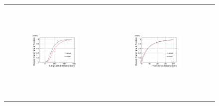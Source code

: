 \begin{figure}[htp]
  \centering
  \begin{tabular}{ccc}
%  
   \includegraphics[width=0.49\textwidth,height=4.9cm]{figures/protons_lcont_overlay}&
   \includegraphics[width=0.49\textwidth,height=4.9cm]{figures/protons_wcont_overlay}\\
% 
 
 

\end{tabular}
\end{figure}
